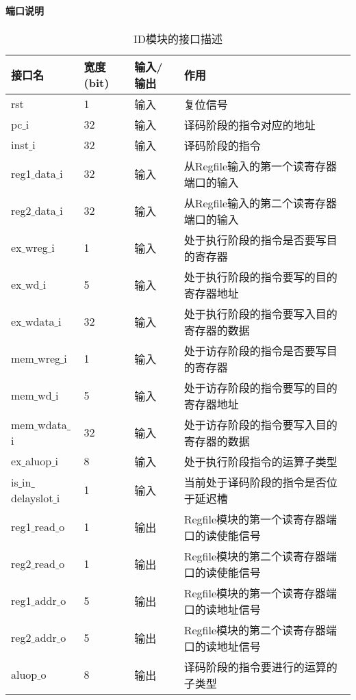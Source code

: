 \paragraph{端口说明}
\quad

\quad
\begin{table}[H]
	\centering
	\caption{ID模块的接口描述}
	\begin{tabular}{|l|l|l|l|}
		\hline
		接口名 & 宽度(bit) & 输入/输出 & 作用 \\
		\hline
		rst & 1 & 输入 & 复位信号 \\
		\hline
		pc$\_$i & 32 & 输入 & 译码阶段的指令对应的地址 \\
		\hline
		inst$\_$i & 32 & 输入 & 译码阶段的指令 \\
		\hline
		reg1$\_$data$\_$i & 32 & 输入 & 从Regfile输入的第一个读寄存器端口的输入 \\
		\hline
		reg2$\_$data$\_$i & 32 & 输入 & 从Regfile输入的第二个读寄存器端口的输入 \\
		\hline
		ex$\_$wreg$\_$i & 1 & 输入 & 处于执行阶段的指令是否要写目的寄存器 \\
		\hline
		ex$\_$wd$\_$i & 5 & 输入 & 处于执行阶段的指令要写的目的寄存器地址 \\
		\hline
		ex$\_$wdata$\_$i & 32 & 输入 & 处于执行阶段的指令要写入目的寄存器的数据 \\
		\hline
		mem$\_$wreg$\_$i & 1 & 输入 & 处于访存阶段的指令是否要写目的寄存器 \\
		\hline
		mem$\_$wd$\_$i & 5 & 输入 & 处于访存阶段的指令要写的目的寄存器地址 \\
		\hline
		mem$\_$wdata$\_$i & 32 & 输入 & 处于访存阶段的指令要写入目的寄存器的数据 \\
		\hline
		ex$\_$aluop$\_$i & 8 & 输入 & 处于执行阶段指令的运算子类型 \\
		\hline
		is$\_$in$\_$delayslot$\_$i & 1 & 输入 & 当前处于译码阶段的指令是否位于延迟槽 \\
		\hline
		reg1$\_$read$\_$o & 1 & 输出 & Regfile模块的第一个读寄存器端口的读使能信号 \\
		\hline
		reg2$\_$read$\_$o & 1 & 输出 & Regfile模块的第二个读寄存器端口的读使能信号 \\
		\hline
		reg1$\_$addr$\_$o & 5 & 输出 & Regfile模块的第一个读寄存器端口的读地址信号 \\
		\hline
		reg2$\_$addr$\_$o & 5 & 输出 & Regfile模块的第二个读寄存器端口的读地址信号 \\
		\hline
		aluop$\_$o & 8 & 输出 & 译码阶段的指令要进行的运算的子类型 \\

\end{tabular}
\end{table}
